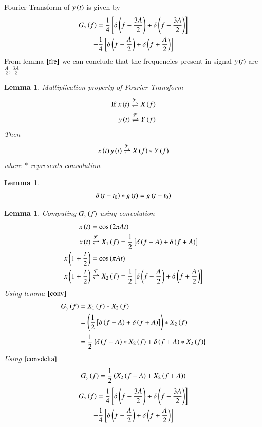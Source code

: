 \documentclass[journal,12pt,twocolumn]{IEEEtran}
\newtheorem{lemma}[theorem]{Lemma}
\begin{document}
Fourier Transform of $y\left(t\right)$ is given by
\begin{multline}
    G_y\left(f\right)=\frac{1}{4}{}\left[\delta\left(f-\frac{3A}{2}\right)+\delta\left(f+\frac{3A}{2}\right)\right]\\+\frac{1}{4}{}\left[\delta\left(f-\frac{A}{2}\right)+\delta\left(f+\frac{A}{2}\right)\right]
\end{multline}
From lemma $\ref{fre}$ we can conclude that the frequencies present in signal $y\left(t\right)$ are $\frac{A}{2},\frac{3A}{2}$
\begin{lemma}{Multiplication property of Fourier Transform}\label{conv}
\begin{align}
    \text{If } x\left(t\right) \overset{\mathcal{F}}{ \rightleftharpoons} X\left(f\right) \\
    y\left(t\right) \overset{\mathcal{F}}{ \rightleftharpoons} Y\left(f\right)
\end{align}
Then
\begin{align}
   x\left(t\right)y\left(t\right) \overset{\mathcal{F}}{ \rightleftharpoons}  X\left(f\right) \ast Y\left(f\right)
\end{align}
where $\ast$ represents convolution
\end{lemma}
\begin{lemma}
\begin{align}
    \delta\left(t-t_0\right)\ast g\left(t\right)=g\left(t-t_0\right)\label{convdelta}
\end{align}
\end{lemma}
\begin{lemma}{Computing $G_y\left(f\right)$ using convolution}
\begin{align}
    x\left(t\right)&=\cos{\ensuremath{\left(2\pi At\right)}}\\
    x\left(t\right)& \overset{\mathcal{F}}{ \rightleftharpoons} X_1\left(f\right)=\frac{1}{2}{}\left[\delta\left(f-A\right)+\delta\left(f+A\right)\right]\\
    x\left(1+\frac{t}{2}\right)&=\cos{\ensuremath{\left(\pi At\right)}}\\
    x\left(1+\frac{t}{2}\right)& \overset{\mathcal{F}}{ \rightleftharpoons} X_2\left(f\right)=\frac{1}{2}{}\left[\delta\left(f-\frac{A}{2}\right)+\delta\left(f+\frac{A}{2}\right)\right]
\end{align}
Using lemma $\ref{conv}$ 
\begin{align}
    G_y\left(f\right)&=X_1\left(f\right)\ast X_2\left(f\right)\\
    &=\left(\frac{1}{2}{}\left[\delta\left(f-A\right)+\delta\left(f+A\right)\right]\right)\ast  X_2\left(f\right)\\
    &=\frac{1}{2}\left\{\delta\left(f-A\right)\ast  X_2\left(f\right)+\delta\left(f+A\right)\ast  X_2\left(f\right)\right\}
\end{align}
Using $\eqref{convdelta}$ 
\begin{align}
    G_y\left(f\right)=\frac{1}{2}\left(X_2\left(f-A\right)+X_2\left(f+A\right)\right)
\end{align}
\begin{multline}
    G_y\left(f\right)=\frac{1}{4}{}\left[\delta\left(f-\frac{3A}{2}\right)+\delta\left(f+\frac{3A}{2}\right)\right]\\+\frac{1}{4}{}\left[\delta\left(f-\frac{A}{2}\right)+\delta\left(f+\frac{A}{2}\right)\right]
\end{multline}
\end{lemma}
\end{document}
